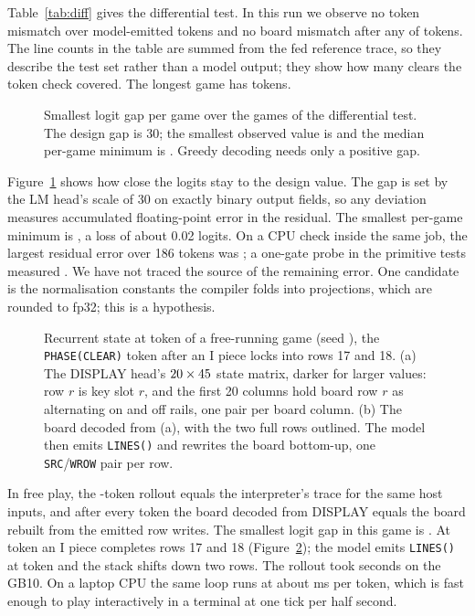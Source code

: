 \documentclass[11pt]{article}
\newcommand{\tok}[1]{\texttt{#1}}
\begin{document}
Table~\ref{tab:diff} gives the differential test. In this run we observe no token mismatch over \nPtwoChecked{} model-emitted tokens and no board mismatch after any of \nPtwoTokens{} tokens. The line counts in the table are summed from the fed reference trace, so they describe the test set rather than a model output; they show how many clears the token check covered. The longest game has \nPtwoMaxGameTokens{} tokens.

\begin{figure}[t]
\centering

\caption{Smallest logit gap per game over the \nPtwoGames{} games of the differential test. The design gap is 30; the smallest observed value is \nPtwoGap{} and the median per-game minimum is \nPtwoGapMedian. Greedy decoding needs only a positive gap.}
\label{fig:gaps}
\end{figure}

Figure~\ref{fig:gaps} shows how close the logits stay to the design value. The gap is set by the LM head's scale of 30 on exactly binary output fields, so any deviation measures accumulated floating-point error in the residual. The smallest per-game minimum is \nPtwoGap{}, a loss of about 0.02 logits. On a CPU check inside the same job, the largest residual error over 186 tokens was \nPtwoResidualErr; a one-gate probe in the primitive tests measured \nPoneOneGate. We have not traced the source of the remaining error. One candidate is the normalisation constants the compiler folds into projections, which are rounded to fp32; this is a hypothesis.

\begin{figure}[t]
\centering

\caption{Recurrent state at token \nPthreeClearTok{} of a free-running game (seed \nPthreeSeed), the \tok{PHASE(CLEAR)} token after an I piece locks into rows 17 and 18. (a) The DISPLAY head's $20 \times 45$ state matrix, darker for larger values: row $r$ is key slot $r$, and the first 20 columns hold board row $r$ as alternating on and off rails, one pair per board column. (b) The board decoded from (a), with the two full rows outlined. The model then emits \tok{LINES(\nPthreeMultiK)} and rewrites the board bottom-up, one \tok{SRC}/\tok{WROW} pair per row.}
\label{fig:state}
\end{figure}

In free play, the \nPthreeTokens-token rollout equals the interpreter's trace for the same host inputs, and after every token the board decoded from DISPLAY equals the board rebuilt from the emitted row writes. The smallest logit gap in this game is \nPthreeGap. At token \nPthreeClearTok{} an I piece completes rows 17 and 18 (Figure~\ref{fig:state}); the model emits \tok{LINES(\nPthreeMultiK)} at token \nPthreeMultiTok{} and the stack shifts down two rows. The rollout took \nPthreeRolloutSeconds{} seconds on the GB10. On a laptop CPU the same loop runs at about \nPthreeLaptopMs{} ms per token, which is fast enough to play interactively in a terminal at one tick per half second.
\end{document}
